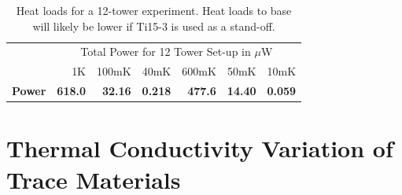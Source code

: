 \documentclass{report}
\begin{document}
\begin{table}[h]
\begin{threeparttable}
\begin{tabular}{rrrr|rrr}
\toprule
 & \multicolumn{6}{c}{\large{Total Power for 12 Tower Set-up in $\mu$W}} \\
  & 1K & 100mK & 40mK & 600mK & 50mK & 10mK \\
 \cmidrule(r){2-7}
   \bf{\large{Power}} & \large{\bf{618.0}} & \large{\bf{32.16}} & \large{\bf{0.218}} & \large{\bf{477.6}} & \large{\bf{14.40}} & \large{\bf{0.059}} \\
\bottomrule
\end{tabular}
\end{threeparttable}
\caption{Heat loads for a 12-tower experiment. Heat loads to base will likely be lower if Ti15-3 is used as a stand-off.}
\end{table}


\newpage

\appendix
\section{Thermal Conductivity Variation of Trace Materials}
\end{document}
